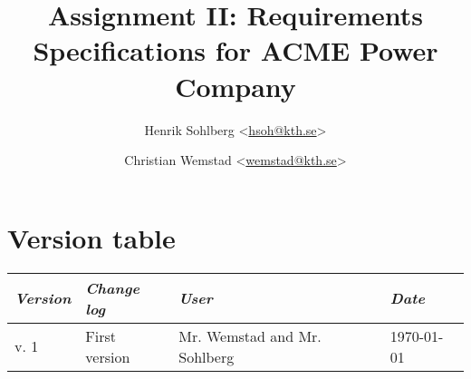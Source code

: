 \documentclass[a4paper]{article}
\title{Assignment II: Requirements Specifications for ACME Power Company}
\author{Henrik Sohlberg <\href{mailto:hsoh@kth.se}{hsoh@kth.se}> %
\and Christian Wemstad <\href{mailto:wemstad@kth.se}{wemstad@kth.se}> %
}
\begin{document}
\thispagestyle{empty}
\maketitle
\thispagestyle{empty}
\pagestyle{empty}
\newpage
\section*{Version table}
\label{sec:version_tabel}
\begin{table}[H]
	\centering
	\begin{tabular}{|l|l|l|l|}
		\hline
			\textit{Version} & \textit{Change log} & \textit{User} & \textit{Date}\\
		\hline
		     v. 1 & First version & Mr. Wemstad and Mr. Sohlberg & \today \\
		\hline
	\end{tabular}
\end{table}
\newpage       
\tableofcontents
\newpage
\pagestyle{fancy}
\setcounter{page}{1}












\clearpage


 
\end{document}
